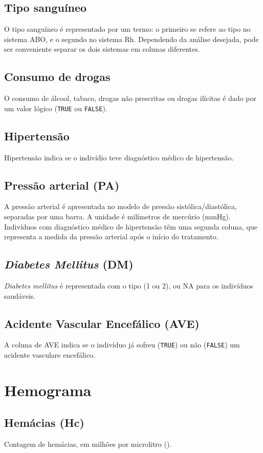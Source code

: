 \documentclass{book}
\begin{document}
\subsection{Tipo sanguíneo}
O tipo sanguíneo é representado por um termo: o primeiro se refere ao tipo no sistema ABO, e o segundo no sistema Rh. Dependendo da análise desejada, pode ser conveniente separar os dois sistemas em colunas diferentes.

\subsection{Consumo de drogas}
O consumo de álcool, tabaco, drogas não prescritas ou drogas ilícitas é dado por um valor lógico (\texttt{TRUE} ou \texttt{FALSE}).

\subsection{Hipertensão}
Hipertensão indica se o indivídio teve diagnóstico médico de hipertensão.

\subsection{Pressão arterial (PA)}
A pressão arterial é apresentada no modelo de pressão sistólica/diastólica, separadas por uma barra. A unidade é milímetros de mercúrio (mmHg). Indivíduos com diagnóstico médico de hipertensão têm uma segunda coluna, que representa a medida da pressão arterial após o início do tratamento.

\subsection{\textit{Diabetes Mellitus} (DM)}
\textit{Diabetes mellitus} é representada com o tipo (1 ou 2), ou NA para os indivíduos saudáveis.

\subsection{Acidente Vascular Encefálico (AVE)}
A coluna de AVE indica se o indivíduo já sofreu (\texttt{TRUE}) ou não (\texttt{FALSE}) um acidente vasculare encefálico.

\section{Hemograma}

\subsection{Hemácias (Hc)}
Contagem de hemácias, em milhões por microlitro ().
\end{document}
